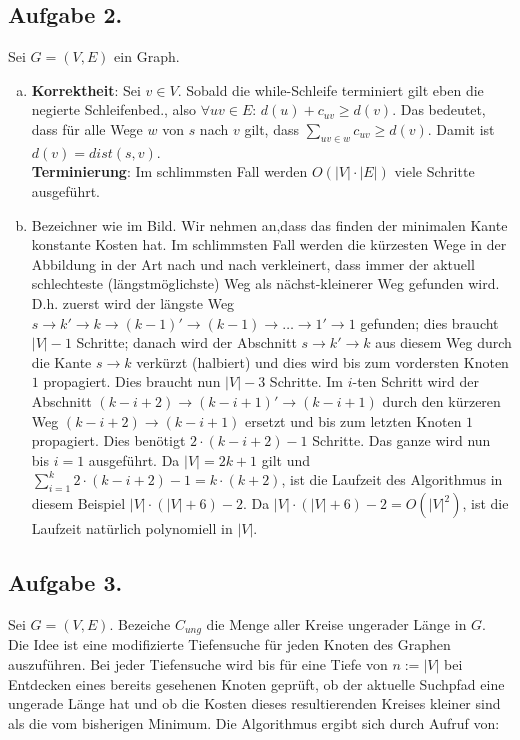 \documentclass[11pt,a4paper,ngerman]{article}
\begin{document}
\subsection*{Aufgabe 2.}
Sei $G = (V,E)$ ein Graph.
\begin{enumerate}[a)]
\item \textbf{Korrektheit}: Sei $v \in V$. Sobald die while-Schleife terminiert gilt eben die negierte Schleifenbed., also $\forall uv \in E: \, d(u) + c_{uv} \geq d(v)$. Das bedeutet, dass für alle Wege $w$ von $s$ nach $v$ gilt, dass $\sum_{uv \in w} c_{uv} \geq d(v)$. Damit ist $d(v) = dist(s,v)$. \\
\textbf{Terminierung}: Im schlimmsten Fall werden $O(|V| \cdot |E|)$ viele Schritte ausgeführt.

\item Bezeichner wie im Bild. Wir nehmen an,dass das finden der minimalen Kante konstante Kosten hat. Im schlimmsten Fall werden die kürzesten Wege in der Abbildung in der Art nach und nach verkleinert, dass immer der aktuell schlechteste (längstmöglichste) Weg als nächst-kleinerer Weg gefunden wird. D.h. zuerst wird der längste Weg $s \to k' \to k \to (k-1)' \to (k-1) \to \ldots \to 1' \to 1$ gefunden; dies braucht $|V|-1$ Schritte; danach wird der Abschnitt $s \to k' \to k$ aus diesem Weg durch die Kante $s \to k$ verkürzt (halbiert) und dies wird bis zum vordersten Knoten $1$ propagiert. Dies braucht nun $|V|-3$ Schritte. Im $i$-ten Schritt wird der Abschnitt $(k-i+2) \to (k-i+1)' \to (k-i+1)$ durch den kürzeren Weg $(k-i+2) \to (k-i+1)$ ersetzt und bis zum letzten Knoten $1$ propagiert. Dies benötigt $2 \cdot (k-i+2) -1$ Schritte. Das ganze wird nun bis $i = 1$ ausgeführt. Da $|V| = 2k+1$ gilt und $\sum_{i=1}^k 2 \cdot (k-i+2) -1 = k \cdot (k+2)$, ist die Laufzeit des Algorithmus in diesem Beispiel $|V| \cdot (|V| + 6) - 2$. Da $|V| \cdot (|V| + 6) - 2 = O(|V|^2)$, ist die Laufzeit natürlich polynomiell in $|V|$.
\end{enumerate}
\newpage
\subsection*{Aufgabe 3.}
Sei $G = (V,E)$. Bezeiche $C_{ung}$ die Menge aller Kreise ungerader Länge in $G$. \\

Die Idee ist eine modifizierte Tiefensuche für jeden Knoten des Graphen auszuführen.
Bei jeder Tiefensuche wird bis für eine Tiefe von $n := |V|$ bei Entdecken eines bereits gesehenen Knoten geprüft, ob der aktuelle Suchpfad eine ungerade Länge hat und ob die Kosten dieses resultierenden Kreises kleiner sind als die vom bisherigen Minimum.
Die Algorithmus ergibt sich durch Aufruf von: \\
\end{document}
